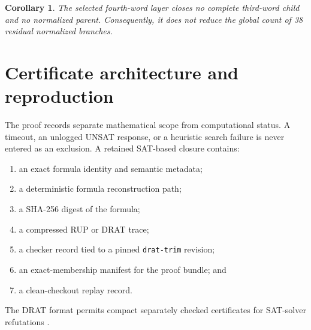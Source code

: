 \documentclass[11pt]{article}
\newtheorem{corollary}[theorem]{Corollary}
\theoremstyle{definition}
\theoremstyle{remark}
\begin{document}
\begin{corollary}
The selected fourth-word layer closes no complete third-word child and
no normalized parent.  Consequently, it does not reduce the global
count of 38 residual normalized branches.
\end{corollary}

\section{Certificate architecture and reproduction}

The proof records separate mathematical scope from computational
status.  A timeout, an unlogged UNSAT response, or a heuristic search
failure is never entered as an exclusion.  A retained SAT-based closure
contains:
\begin{enumerate}
  \item an exact formula identity and semantic metadata;
  \item a deterministic formula reconstruction path;
  \item a SHA-256 digest of the formula;
  \item a compressed RUP or DRAT trace;
  \item a checker record tied to a pinned \texttt{drat-trim} revision;
  \item an exact-membership manifest for the proof bundle; and
  \item a clean-checkout replay record.
\end{enumerate}
The DRAT format permits compact separately checked certificates for
SAT-solver refutations \cite{heule-drat}.
\end{document}
